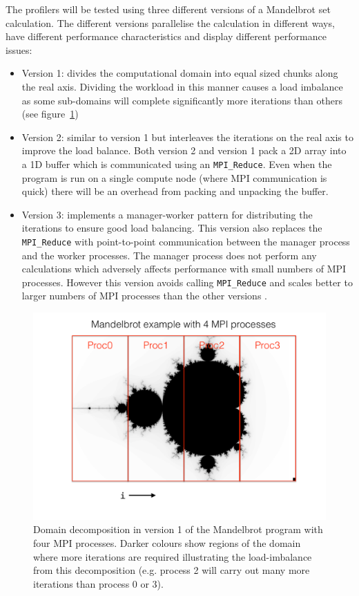 \documentclass[a4paper,titlepage]{article}
\begin{document}
The profilers will be tested using three different versions of a Mandelbrot set calculation. The different versions parallelise the calculation in different ways, have different performance characteristics and display different performance issues:
\begin{itemize}
\item Version 1: divides the computational domain into equal sized chunks along the real axis. Dividing the workload in this manner causes a load imbalance as some sub-domains will complete significantly more iterations than others (see figure~\ref{fig:mandelbrot_dd})
\item Version 2: similar to version 1 but interleaves the iterations on the real axis to improve the load balance. Both version 2 and version 1 pack a 2D array into a 1D buffer which is communicated using an \verb+MPI_Reduce+. Even when the program is run on a single compute node (where MPI communication is quick) there will be an overhead from packing and unpacking the buffer.
\item Version 3: implements a manager-worker pattern for distributing the iterations to ensure good load balancing. This version also replaces the \verb+MPI_Reduce+ with point-to-point communication between the manager process and the worker processes. The manager process does not perform any calculations which adversely affects performance with small numbers of MPI processes. However this version avoids calling \verb+MPI_Reduce+ and scales better to larger numbers of MPI processes than the other versions .
\end{itemize}
\begin{figure}[htbp]
\begin{center}
\includegraphics[scale=0.5]{figures/mandelbrot_dd}
\caption{Domain decomposition in version 1 of the Mandelbrot program with four MPI processes. Darker colours show regions of the domain where more iterations are required illustrating the load-imbalance from this decomposition (e.g. process 2 will carry out many more iterations than process 0 or 3).}
\label{fig:mandelbrot_dd}
\end{center}
\end{figure}
\end{document}
